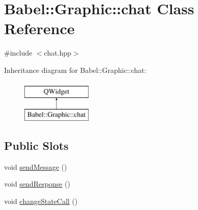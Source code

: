 \hypertarget{classBabel_1_1Graphic_1_1chat}{}\section{Babel\+:\+:Graphic\+:\+:chat Class Reference}
\label{classBabel_1_1Graphic_1_1chat}


{\ttfamily \#include $<$chat.\+hpp$>$}

Inheritance diagram for Babel\+:\+:Graphic\+:\+:chat\+:\begin{figure}[H]
\begin{center}
\leavevmode
\includegraphics[height=2.000000cm]{classBabel_1_1Graphic_1_1chat}
\end{center}
\end{figure}
\subsection*{Public Slots}
\begin{DoxyCompactItemize}
\item 
void \hyperlink{classBabel_1_1Graphic_1_1chat_af54d04ad8dace079d8c72e434a9049dd}{send\+Message} ()
\item 
void \hyperlink{classBabel_1_1Graphic_1_1chat_a13a3f384e20d50aa624cbcb8b07dea49}{send\+Response} ()
\item 
void \hyperlink{classBabel_1_1Graphic_1_1chat_af189c34325760de37bba985927160657}{change\+State\+Call} ()
\end{DoxyCompactItemize}
